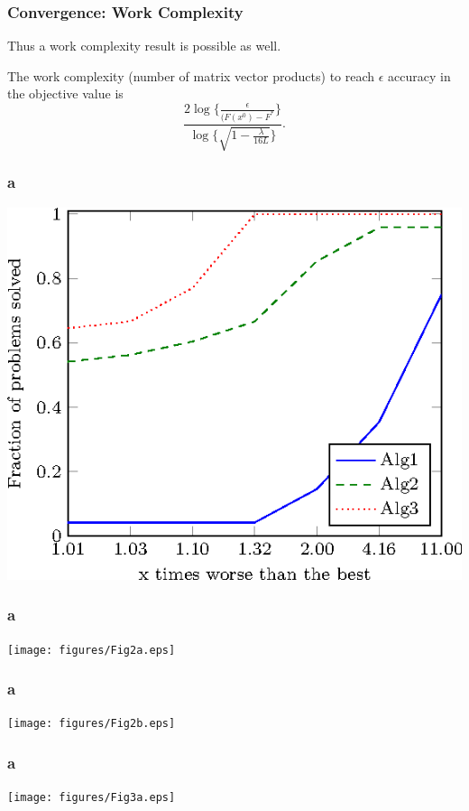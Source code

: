 \documentclass{beamer}
\begin{document}
	        \begin{frame}
	                                                    \frametitle{Convergence: Work Complexity}
	      Thus a work complexity result is possible as well. 
	    \begin{corollary}
	    The work complexity (number of matrix vector products) to reach $\epsilon$ accuracy in the objective value is 
	 \begin{equation*}
	  \frac{ 2 \log \{\frac{\epsilon}{(F(x^0) - F^*} \}}{\log\{ \sqrt{1-\frac{\lambda}{16 L}}\} }. 
	   \end{equation*}
	\end{corollary}
	                         \end{frame}
							 
							 
							 

							 \begin{frame}
							 	\frametitle{a}
							 				\includegraphics[scale=1]{figures/Fig1.eps}
							 \end{frame}
							 \begin{frame}
							 	\frametitle{a}
							 				\texttt{[image: figures/Fig2a.eps]}
							 \end{frame}
							 \begin{frame}
							 	\frametitle{a}
							 				\texttt{[image: figures/Fig2b.eps]}
							 \end{frame}
							 \begin{frame}
							 	\frametitle{a}
							 				\texttt{[image: figures/Fig3a.eps]}
							 \end{frame}
\end{document}
